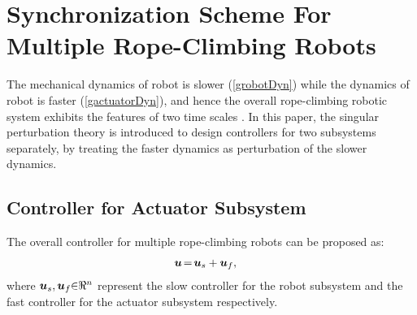 \documentclass[letterpaper, 10 pt, conference]{ieeeconf}
\begin{document}
\section{Synchronization Scheme For Multiple Rope-Climbing Robots}
The mechanical dynamics of robot is slower
(\ref{grobotDyn}) while the dynamics of robot is faster (\ref{gactuatorDyn}), and hence the overall rope-climbing robotic system
exhibits the features of two time scales
\cite{automatica95_spong}. In this paper, the singular perturbation
theory \cite{khalil} is introduced to design controllers for two
subsystems separately, by treating the faster dynamics as
perturbation of the slower dynamics.

\subsection{Controller for Actuator Subsystem}

The overall controller for multiple rope-climbing robots can be proposed as:
\begin{eqnarray}
&\bm u\hspace{-0.05cm}=\hspace{-0.05cm}\bm u_s+\bm
u_f,\label{overall}
\end{eqnarray}
where $\bm u_s, \bm u_f\hspace{-0.1cm}\in\hspace{-0.1cm}\Re^n$
represent the slow controller for the robot subsystem and the fast controller for the actuator subsystem respectively.
\end{document}
